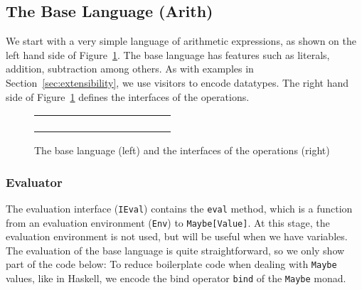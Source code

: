 
\subsection{The Base Language (Arith)}

We start with a very simple language of arithmetic expressions, as shown on the
left hand side of Figure~\ref{fig:base-lang}. The base language has features
such as literals, addition, subtraction among others. As with examples in
Section~\ref{sec:extensibility}, we use visitors to encode datatypes. The
right hand side of Figure~\ref{fig:base-lang} defines the interfaces of the
operations.

\begin{figure}[t]
  \centering
  \begin{tabular}{cc}
    \begin{subfigure}[t]{0.45\textwidth}
      \centering
    \end{subfigure}
    &
    \begin{subfigure}[t]{0.45\textwidth}
      \centering
    \end{subfigure}
  \end{tabular}
  \caption{The base language (left) and the interfaces of the operations (right)}
  \label{fig:base-lang}
\end{figure}

\subsubsection{Evaluator}

The evaluation interface (\lstinline{IEval}) contains the \lstinline{eval}
method, which is a function from an evaluation environment (\lstinline{Env}) to
\lstinline{Maybe[Value]}. At this stage, the evaluation environment is not used,
but will be useful when we have variables. The evaluation of the base language
is quite straightforward, so we only show part of the code below:
To reduce boilerplate code when dealing with \lstinline{Maybe} values, like in
Haskell, we encode the bind operator \lstinline{bind} of the \lstinline{Maybe}
monad.

